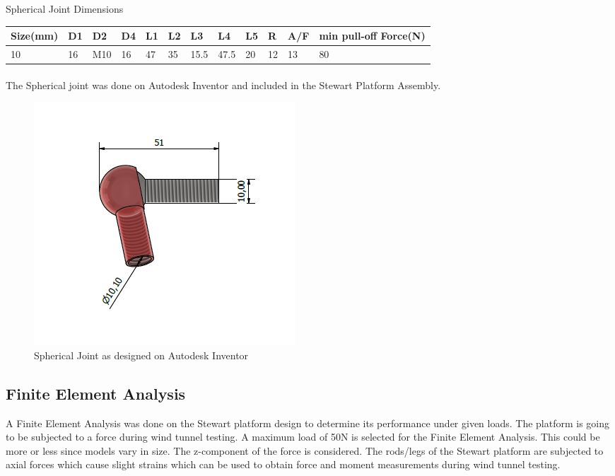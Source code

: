 \begin{table}[H]
\caption{Spherical Joint Dimensions}
\end{table}
\begin{tabular}{|l|l|l|l|l|l|l|l|l|l|l|l|}
\hline
\textbf{Size(mm)}& \textbf{D1}& \textbf{D2}&\textbf{ D4}& \textbf{L1}& \textbf{L2}& \textbf{L3}& \textbf{L4}& \textbf{L5}& \textbf{R} & \textbf{A/F} & \textbf{min pull-off Force(N)}\\
\hline
10 & 16 & M10 & 16 & 47 & 35 & 15.5 & 47.5& 20 & 12 & 13 & 80\\
\hline
\end{tabular}

\paragraph{}

The Spherical joint was done on Autodesk Inventor and included in the Stewart Platform Assembly.
\begin{center}
	\begin{figure}[H]
	\centering
	\includegraphics[width=0.5\linewidth]{Figures/Spherical CAD}
	\caption[Spherical Joint CAD]{Spherical Joint as designed on Autodesk Inventor}
	\end{figure}
\end{center}
\subsection{Finite Element Analysis}
A Finite Element Analysis was done on the Stewart platform design to determine its performance under given loads. The platform is going to be subjected to a force during wind tunnel testing. A maximum load of 50N is selected for the Finite Element Analysis. This could be more or less since models vary in size. The z-component of the force is considered.
The rods/legs of the Stewart platform are subjected to axial forces which cause slight strains which can be used to obtain force and moment measurements during wind tunnel testing.
